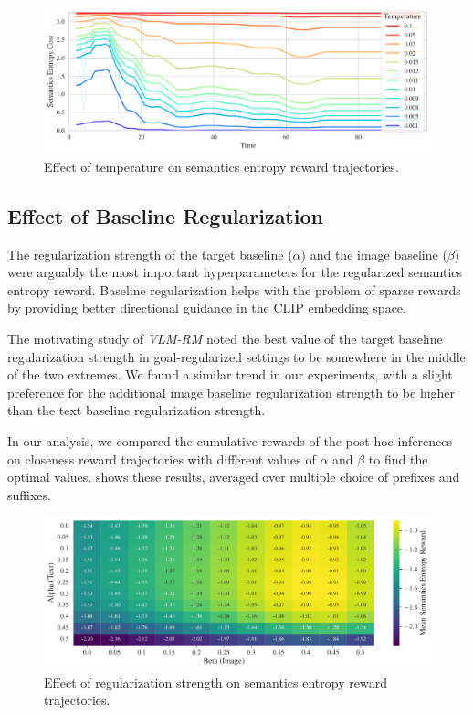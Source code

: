 \begin{figure}[h]
    \centering
    \includegraphics[width=\textwidth]{images/temperature_comparison.pdf}
    \caption{Effect of temperature on semantics entropy reward trajectories.}
    \label{fig:clip-temperature}    
\end{figure}

\subsection{Effect of Baseline Regularization}
\label{sec:reg-alpha-beta}

The regularization strength of the target baseline (\(\alpha\)) and the image baseline (\(\beta\)) were arguably the most important hyperparameters for the regularized semantics entropy reward.
Baseline regularization helps with the problem of sparse rewards by providing better directional guidance in the CLIP embedding space.

The motivating study of \emph{VLM-RM} noted the best value of the target baseline regularization strength in goal-regularized settings to be somewhere in the middle of the two extremes.
We found a similar trend in our experiments, with a slight preference for the additional image baseline regularization strength to be higher than the text baseline regularization strength.

In our analysis, we compared the cumulative rewards of the post hoc inferences on closeness reward trajectories with different values of \(\alpha\) and \(\beta\) to find the optimal values.
 shows these results, averaged over multiple choice of prefixes and suffixes.

\begin{figure}[h]
    \centering
    \includegraphics[width=\textwidth]{images/alpha_beta_temp12avg_noneg.pdf}
    \caption{Effect of regularization strength on semantics entropy reward trajectories.}
    \label{fig:clip-alpha-beta}
\end{figure}


